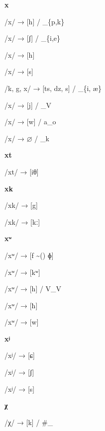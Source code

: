\begin{center}\textbf{x}\end{center}
\begin{multicols}{4}
\noindent /x/ → [h] / \_\{p,k\}

\noindent /x/ → [ʃ] / \_\{i,e\}

\noindent /x/ → [h]

\noindent /x/ → [s]

\noindent /k, g, x/ → [ts, dz, s] / \_\{i, æ\}

\noindent /x/ → [j] / \_V

\noindent /x/ → [w] / a\_o

\noindent /x/ → $\varnothing$ / \_k
\end{multicols}


\begin{center}\textbf{xt}\end{center}
\begin{multicols}{4}
\noindent /xt/ → [iθ]
\end{multicols}


\begin{center}\textbf{xk}\end{center}
\begin{multicols}{4}
\noindent /xk/ → [g]

\noindent /xk/ → [kː]
\end{multicols}


\begin{center}\textbf{xʷ}\end{center}
\begin{multicols}{4}
\noindent /xʷ/ → [f \textasciitilde() ɸ]

\noindent /xʷ/ → [kʷ]

\noindent /xʷ/ → [h] / V\_V

\noindent /xʷ/ → [ħ]

\noindent /xʷ/ → [w]
\end{multicols}


\begin{center}\textbf{xʲ}\end{center}
\begin{multicols}{4}
\noindent /xʲ/ → [ɕ]

\noindent /xʲ/ → [ʃ]

\noindent /xʲ/ → [s]
\end{multicols}


\begin{center}\textbf{χ}\end{center}
\begin{multicols}{4}
\noindent /χ/ → [k] / \#\_
\end{multicols}


